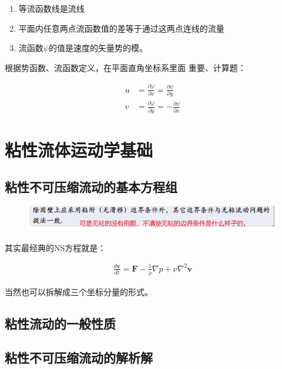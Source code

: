 \documentclass[UTF8,12pt]{article}
\begin{document}
 \begin{enumerate}
    \item 等流函数线是流线
    \item 平面内任意两点流函数值的差等于通过这两点连线的流量
    \item 流函数$\psi $的值是速度的矢量势的模。
  \end{enumerate}

根据势函数、流函数定义，在平面直角坐标系里面{\color{red} 重要、计算题}：

\begin{align*}
    u &= \frac{\partial \varphi}{\partial x} = \frac{\partial \psi}{\partial y}\\
    v &= \frac{\partial \varphi}{\partial y} = - \frac{\partial \psi}{\partial x}
\end{align*}

\section{粘性流体运动学基础}

\subsection{粘性不可压缩流动的基本方程组}

\begin{figure}[h]
    \centering
    \includegraphics[width=.8\linewidth]{img/wunian-bianjie-ques.png}
\end{figure}

其实最经典的NS方程就是：

\begin{align*}
    \frac{d \boldsymbol v}{dt} = \boldsymbol F - \frac{1}{\rho} \nabla p + \nu \nabla ^2 \boldsymbol v
\end{align*}

当然也可以拆解成三个坐标分量的形式。

\subsection{粘性流动的一般性质}

\subsection{粘性不可压缩流动的解析解}
\end{document}
